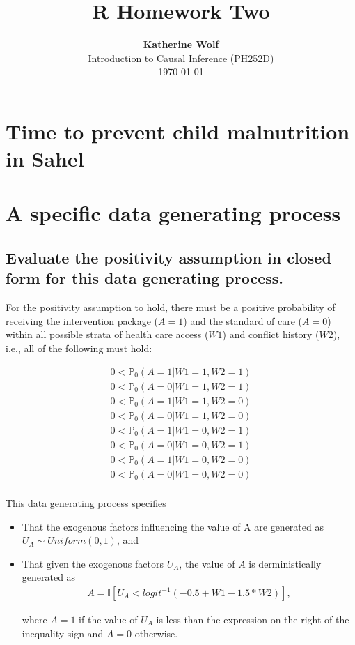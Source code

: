 \documentclass{article}\usepackage[]{graphicx}\usepackage[]{xcolor}
\title{\textbf{R Homework Two}}
\author{\textbf{Katherine Wolf}\\ Introduction to Causal Inference (PH252D)\\ \today}
\date{}
\begin{document}
\maketitle

\section{Time to prevent child malnutrition in Sahel}

\section{A specific data generating process}

  \subsection{Evaluate the positivity assumption in closed form for this data generating process.}
  
For the positivity assumption to hold, there must be a positive probability of receiving the intervention package ($A = 1$) and the standard of care ($A = 0$) within all possible strata of health care access ($W1$) and conflict history ($W2$), i.e., all of the following must hold:

\begin{align*}
0<\mathbb{P}_0(A=1|W1=1,W2=1) \\
0<\mathbb{P}_0(A=0|W1=1,W2=1) \\
0<\mathbb{P}_0(A=1|W1=1,W2=0) \\
0<\mathbb{P}_0(A=0|W1=1,W2=0) \\
0<\mathbb{P}_0(A=1|W1=0,W2=1) \\
0<\mathbb{P}_0(A=0|W1=0,W2=1) \\
0<\mathbb{P}_0(A=1|W1=0,W2=0) \\
0<\mathbb{P}_0(A=0|W1=0,W2=0) \\
\end{align*}

This data generating process specifies
\begin{itemize}
\item That the exogenous factors influencing the value of A are generated as $U_A \sim Uniform(0,1)$, and 
\item That given the exogenous factors $U_A$, the value of $A$ is derministically generated as 
\begin{align*}
A=\mathbb{I}[U_A<logit^{-1}(-0.5+W1-1.5*W2)],
\end{align*}

where $A=1$ if the value of $U_A$ is less than the expression on the right of the inequality sign and $A=0$ otherwise.
\end{itemize}
\end{document}
